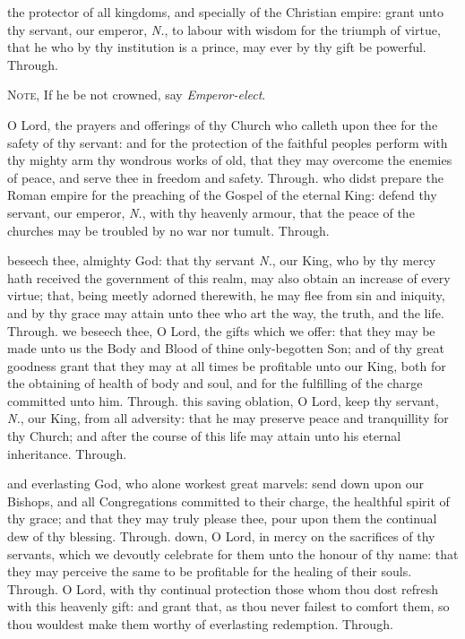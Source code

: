 \begin{multicols}{2}

 the protector of all kingdoms, and specially of the Christian empire: grant unto thy servant, our emperor, \textit{N.}, to labour with wisdom for the triumph of virtue, that he who by thy institution is a prince, may ever by thy gift be powerful. Through.
\begin{rubric}
    \textsc{Note,} If he be not crowned, say \emph{Emperor-elect}.
\end{rubric}

\vspace{-3ex}

 O Lord, the prayers and offerings of thy Church who calleth upon thee for the safety of thy servant: and for the protection of the faithful peoples perform with thy mighty arm thy wondrous works of old, that they may overcome the enemies of peace, and serve thee in freedom and safety. Through.
 who didst prepare the Roman empire for the preaching of the Gospel of the eternal King: defend thy servant, our emperor, \textit{N.}, with thy heavenly armour, that the peace of the churches may be troubled by no war nor tumult. Through.

 beseech thee, almighty God: that thy servant \textit{N.}, our King, who by thy mercy hath received the government of this realm, may also obtain an increase of every virtue; that, being meetly adorned therewith, he may flee from sin and iniquity, and by thy grace may attain unto thee who art the way, the truth, and the life. Through.
 we beseech thee, O Lord, the gifts which we offer: that they may be made unto us the Body and Blood of thine only-begotten Son; and of thy great goodness grant that they may at all times be profitable unto our King, both for the obtaining of health of body and soul, and for the fulfilling of the charge committed unto him. Through.
 this saving oblation, O Lord, keep thy servant, \textit{N.}, our King, from all adversity: that he may preserve peace and tranquillity for thy Church; and after the course of this life may attain unto his eternal inheritance. Through.

 and everlasting God, who alone workest great marvels: send down upon our Bishops, and all Congregations committed to their charge, the healthful spirit of thy grace; and that they may truly please thee, pour upon them the continual dew of thy blessing. Through.
 down, O Lord, in mercy on the sacrifices of thy servants, which we devoutly celebrate for them unto the honour of thy name: that they may perceive the same to be profitable for the healing of their souls. Through.
 O Lord, with thy continual protection those whom thou dost refresh with this heavenly gift: and grant that, as thou never failest to comfort them, so thou wouldest make them worthy of everlasting redemption. Through.


\end{multicols}
